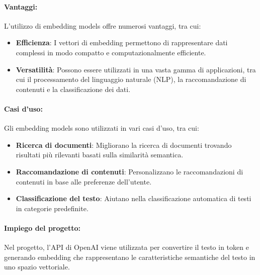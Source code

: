 \paragraph{Vantaggi:}
L'utilizzo di embedding models offre numerosi vantaggi, tra cui:
\begin{itemize}
    \item \textbf{Efficienza}: I vettori di embedding permettono di rappresentare dati complessi in modo compatto e computazionalmente efficiente.
    \item \textbf{Versatilità}: Possono essere utilizzati in una vasta gamma di applicazioni, tra cui il processamento del linguaggio naturale (NLP), la raccomandazione di contenuti e la classificazione dei dati.
\end{itemize}
\paragraph{Casi d'uso:}
Gli embedding models sono utilizzati in vari casi d'uso, tra cui:
\begin{itemize}
    \item \textbf{Ricerca di documenti}: Migliorano la ricerca di documenti trovando risultati più rilevanti basati sulla similarità semantica.
    \item \textbf{Raccomandazione di contenuti}: Personalizzano le raccomandazioni di contenuti in base alle preferenze dell'utente.
    \item \textbf{Classificazione del testo}: Aiutano nella classificazione automatica di testi in categorie predefinite.
\end{itemize}



\paragraph{Impiego del progetto:}
Nel progetto, l'API di OpenAI viene utilizzata per convertire il testo in token e generando embedding che rappresentano le caratteristiche semantiche del testo in uno spazio vettoriale.



